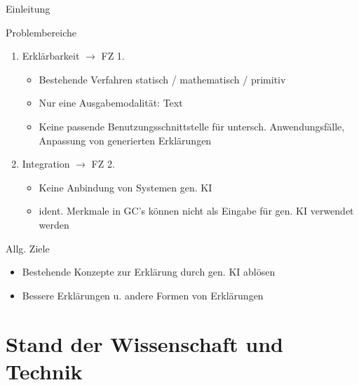 \documentclass[t]{beamer}
\begin{document}
\begin{frame}{Einleitung}

  \begin{block}{Problembereiche}
    \begin{enumerate}
      \item Erklärbarkeit $\rightarrow$ FZ 1.
      \begin{itemize}
        \item Bestehende Verfahren statisch / mathematisch / primitiv
        \item Nur eine Ausgabemodalität: Text
        \item Keine passende Benutzungsschnittstelle für untersch. Anwendungsfälle, Anpassung von generierten Erklärungen
      \end{itemize}
      \item Integration $\rightarrow$ FZ 2.
      \begin{itemize}
        \item Keine Anbindung von Systemen gen. KI
        \item ident. Merkmale in GC's können nicht als Eingabe für gen. KI verwendet werden
      \end{itemize}
    \end{enumerate}
  \end{block}

  \begin{exampleblock}{Allg. Ziele}
    \begin{itemize}
      \item Bestehende Konzepte zur Erklärung durch gen. KI ablösen
      \item Bessere Erklärungen u. andere Formen von Erklärungen
    \end{itemize}
  \end{exampleblock}

\end{frame}

\section{Stand der Wissenschaft und Technik}
\end{document}
